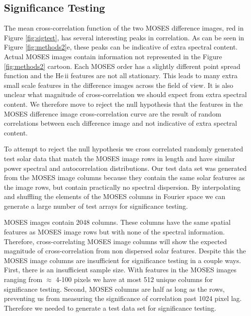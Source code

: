 	
	\subsection{Significance Testing}\label{sec:sigtesting}
	
		The mean cross-correlation function of the two MOSES difference images, red in Figure \ref{fig:sigtest}, has several interesting peaks in correlation.  
		As can be seen in Figure \ref{fig:methods2}e, these peaks can be indicative of extra spectral content.  
		Actual MOSES images contain information not represented in the Figure \ref{fig:methods2} cartoon.  
		Each MOSES order has a slightly different point spread function and the He\,{\sc ii} features are not all stationary.  
		This leads to many extra small scale features in the difference images across the field of view.  
		It is also unclear what magnitude of cross-correlation we should expect from extra spectral content.  
		We therefore move to reject the null hypothesis that the features in the MOSES difference image cross-correlation curve are the result of random correlations between each difference image and not indicative of extra spectral content.  
	
		To attempt to reject the null hypothesis we cross correlated randomly generated test solar data that match the MOSES image rows in length and have similar power spectral and autocorrelation distributions.  
		Our test data set was generated from the MOSES image columns because they contain the same solar features as the image rows, but contain practically no spectral dispersion.  
		By interpolating and shuffling the elements of the MOSES columns in Fourier space we can generate a large number of test arrays for significance testing.
	
		MOSES images contain 2048 columns.  
		These columns have the same spatial features as MOSES image rows but with none of the spectral information.  
		Therefore, cross-correlating MOSES image columns will show the expected magnitude of cross-correlation from non dispersed solar features.  
		Despite this the MOSES image columns are insufficient for significance testing in a couple ways.  First, there is an insufficient sample size.  
		With features in the MOSES images ranging from $\approx$ 4-100 pixels we have at most 512 unique columns for significance testing.  
		Second, MOSES columns are half as long as the rows, preventing us from measuring the significance of correlation past 1024 pixel lag.  Therefore we needed to generate a test data set for significance testing.
	
